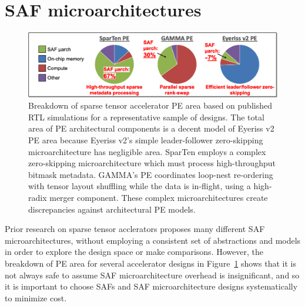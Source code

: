 

\section{SAF microarchitectures}
\label{background:saf_uarch}
%
%
\begin{figure}[H]
\includegraphics[width=\textwidth]{figures/saf_uarch_significance.PNG}
\caption{Breakdown of sparse tensor accelerator PE area based on published RTL simulations for a representative sample of designs. The total area of PE architectural components is a decent model of Eyeriss v2\cite{eyerissv2} PE area because Eyeriss v2's simple leader-follower zero-skipping microarchitecture has negligible area. SparTen\cite{sparten} employs a complex zero-skipping microarchitecture which must process high-throughput bitmask metadata. GAMMA's\cite{gamma} PE coordinates loop-nest re-ordering with tensor layout shuffling while the data is in-flight, using a high-radix merger component. These complex microarchitectures create discrepancies against architectural PE models.}
\label{fig:saf_uarch_significance}
\centering
\end{figure}

Prior research on sparse tensor acclerators proposes many different SAF microarchitectures, without employing a consistent set of abstractions and models in order to explore the design space or make comparisons. However, the breakdown of PE area for several accelerator designs in Figure~\ref{fig:saf_uarch_significance} shows that it is not always safe to assume SAF microarchitecture overhead is insignificant, and so it is important to choose SAFs and SAF microarchitecture designs systematically to minimize cost.

